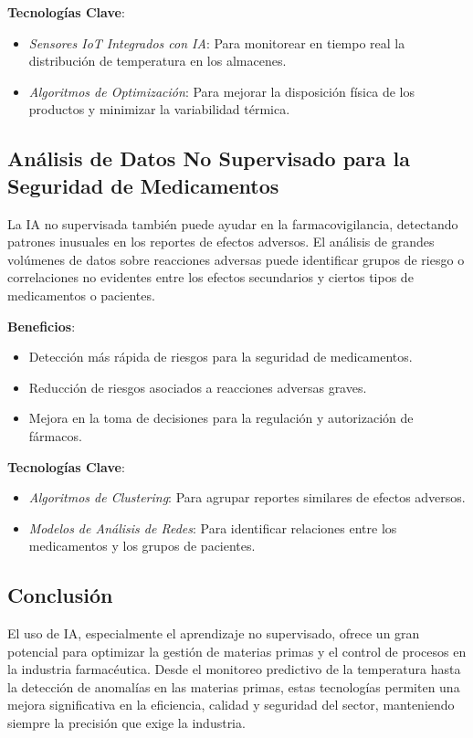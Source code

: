\textbf{Tecnologías Clave}:
\begin{itemize}
    \item \textit{Sensores IoT Integrados con IA}: Para monitorear en tiempo real la distribución de temperatura en los almacenes.
    \item \textit{Algoritmos de Optimización}: Para mejorar la disposición física de los productos y minimizar la variabilidad térmica.
\end{itemize}

\subsection{Análisis de Datos No Supervisado para la Seguridad de Medicamentos}

La IA no supervisada también puede ayudar en la farmacovigilancia, detectando patrones inusuales en los reportes de efectos adversos. El análisis de grandes volúmenes de datos sobre reacciones adversas puede identificar grupos de riesgo o correlaciones no evidentes entre los efectos secundarios y ciertos tipos de medicamentos o pacientes.

\textbf{Beneficios}:
\begin{itemize}
    \item Detección más rápida de riesgos para la seguridad de medicamentos.
    \item Reducción de riesgos asociados a reacciones adversas graves.
    \item Mejora en la toma de decisiones para la regulación y autorización de fármacos.
\end{itemize}

\textbf{Tecnologías Clave}:
\begin{itemize}
    \item \textit{Algoritmos de Clustering}: Para agrupar reportes similares de efectos adversos.
    \item \textit{Modelos de Análisis de Redes}: Para identificar relaciones entre los medicamentos y los grupos de pacientes.
\end{itemize}

\subsection{Conclusión}

El uso de IA, especialmente el aprendizaje no supervisado, ofrece un gran potencial para optimizar la gestión de materias primas y el control de procesos en la industria farmacéutica. Desde el monitoreo predictivo de la temperatura hasta la detección de anomalías en las materias primas, estas tecnologías permiten una mejora significativa en la eficiencia, calidad y seguridad del sector, manteniendo siempre la precisión que exige la industria.

